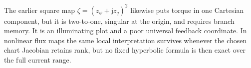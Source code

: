 

The earlier square map \(\zeta=(z_\psi+\mathrm jz_q)^2\) likewise puts torque
in one Cartesian component, but it is two-to-one, singular at the origin, and
requires branch memory. It is an illuminating plot and a poor universal
feedback coordinate. In nonlinear flux maps the same local interpretation
survives whenever the chosen chart Jacobian retains rank, but no fixed
hyperbolic formula is then exact over the full current range.
